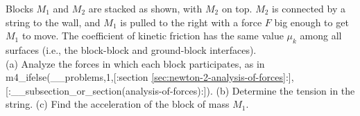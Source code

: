 Blocks $M_1$ and $M_2$ are stacked as shown, with $M_2$ on top. $M_2$
is connected by a string to the wall, and $M_1$ is pulled to the
right with a force $F$ big enough to get $M_1$ to
move. The coefficient of kinetic friction has the same value $\mu_k$ among all surfaces
(i.e., the block-block and ground-block interfaces).\\
%
(a) Analyze the forces in which each block participates, as in
m4_ifelse(__problems,1,[:section \ref{sec:newton-2-analysis-of-forces}:],[:__subsection_or_section(analysis-of-forces):]).\hwendpart
%
(b) Determine the tension in the string.\answercheck\hwendpart
%
(c) Find the acceleration of the block of mass $M_1$.\answercheck
